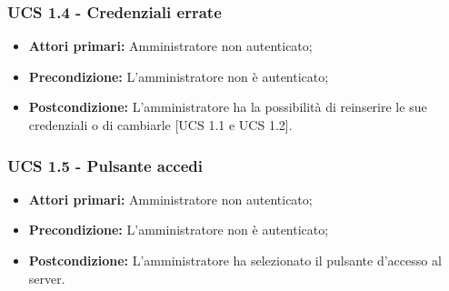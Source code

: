 \subsubsection{UCS 1.4 - Credenziali errate}%
\begin{itemize}
\item \textbf{Attori primari:} Amministratore non autenticato;
\item \textbf{Precondizione:} L'amministratore non è autenticato;
\item \textbf{Postcondizione:} L'amministratore ha la possibilità di reinserire le sue credenziali o di cambiarle [UCS 1.1 e UCS 1.2].
\end{itemize}

\subsubsection{UCS 1.5 - Pulsante accedi}%
\begin{itemize}
\item \textbf{Attori primari:} Amministratore non autenticato;
\item \textbf{Precondizione:} L'amministratore non è autenticato;
\item \textbf{Postcondizione:} L'amministratore ha selezionato il pulsante d'accesso al server.
\end{itemize}
